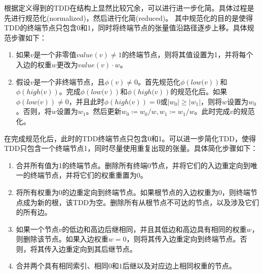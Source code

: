\label{sec-reduce}
根据定义得到的TDD在结构上显然比较冗余，可以进行进一步化简。具体过程是先进行规范化(normalized)，然后进行化简(reduced)\citep{Hong_2022}。
其中规范化的目的是使得TDD的终端节点只包含0和1，同时将终端节点的张量值沿路径逐步上移。具体规范步骤如下：
\begin{enumerate}
    \item 如果$v$是一个非零值$value\left(v\right)\neq 1$的终端节点，则将其值设置为1，并将每个入边的权重$w$更改为$value\left(v\right)\cdot w$。\label{norm1}
    \item 假设$v$是一个非终端节点，且$\phi\left(v\right)\neq 0$。首先规范化$\phi\left.\left(low(v\right)\right)$和$\phi\left.\left(high(v\right)\right)$。完成$\phi\left.\left(low(v\right)\right)$和$\phi\left.\left(high(v\right)\right)$的规范化后。如果$\phi\left.\left(low(v\right)\right)\neq 0$，并且此时$\phi\left.\left(high(v\right)\right)=0$或$\left|w_0\right|\geq\left|w_1\right|$，则将$w$设置为$w_0$。否则，将$w$设置为$w_1$。然后更新$w_0≔w_0/w,w_1≔w_1/w$。此时完成$v$的规范化。\label{norm2}
\end{enumerate}



在完成规范化后，此时的TDD终端节点只包含0和1。可以进一步简化TDD，使得TDD只包含一个终端节点1，同时尽量使用重复出现的张量。具体简化步骤如下：
\begin{enumerate}
    \item 	合并所有值为1的终端节点。删除所有终端$0$节点，并将它们的入边重定向到唯一的终端节点，并将它们的权重重置为$0$。\label{sympl1}
	\item 将所有权重为$0$的边重定向到终端节点。如果根节点的入边权重为$0$，则终端节点成为新的根，该TDD为空。删除所有从根节点不可达的节点，以及涉及它们的所有边。\label{sympl2}
	\item 如果一个节点$v$的低边和高边后继相同，并且其低边和高边具有相同的权重$w$，则删除该节点。如果入边权重$w=0$，则将其传入边重定向到终端节点。否则，将其传入边重定向到其后继节点。\label{sympl3}
	\item 合并两个具有相同索引、相同$0$和$1$后继以及对应边上相同权重的节点。\label{sympl4}
\end{enumerate}


